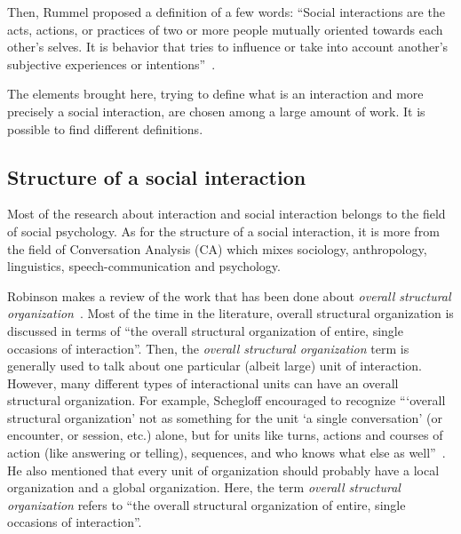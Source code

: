 \documentclass[a4paper,11pt,twoside]{StyleThese}
\begin{document}
Then, Rummel proposed a definition of a few words: ``Social interactions are the acts, actions, or practices of two or more people mutually oriented towards each other's selves. It is behavior that tries to influence or take into account another's subjective experiences or intentions''~\cite{rummel_1976_understanding}.

The elements brought here, trying to define what is an interaction and more precisely a social interaction, are chosen among a large amount of work. It is possible to find different definitions.

\subsection{Structure of a social interaction}\label{chap1:subsec:social_int}
Most of the research about interaction and social interaction belongs to the field of social psychology. As for the structure of a social interaction, it is more from the field of Conversation Analysis (CA) which mixes sociology, anthropology, linguistics, speech-communication and psychology.

Robinson makes a review of the work that has been done about \emph{overall structural organization}~\cite{robinson_overall_2012}. Most of the time in the literature, overall structural organization is discussed in terms of ``the overall structural organization of entire, single occasions of interaction''. Then, the \emph{overall structural organization} term is generally used to talk about one particular (albeit large) unit of interaction. However, many different types of interactional units can have an overall structural organization. For example, Schegloff encouraged to recognize ``‘overall structural organization’ not as something for the unit ‘a single conversation’ (or encounter, or session, etc.) alone, but for units like turns, actions and courses of action (like answering or telling), sequences, and who knows what else as well''~\cite{schegloff_2011_word}. He also mentioned that every unit of organization should probably have a local organization and a global organization. Here, the term \emph{overall structural organization} refers to ``the overall structural organization of entire, single occasions of interaction''. 
\end{document}
